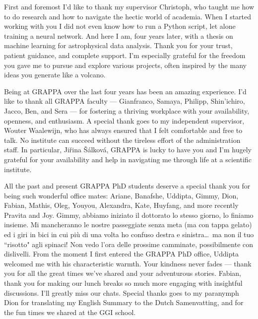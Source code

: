 
First and foremost I’d like to thank my supervisor Christoph, who taught me how to do research and how to navigate the hectic world of academia. When I started working with you I did not even know how to run a Python script, let alone training a neural network. And here I am, four years later, with a thesis on machine learning for astrophysical data analysis. Thank you for your trust, patient guidance, and complete support. I’m especially grateful for the freedom you gave me to pursue and explore various projects, often inspired by the many ideas you generate like a volcano.

Being at GRAPPA over the last four years has been an amazing experience. I'd like to thank all GRAPPA faculty --- Gianfranco, Samaya, Philipp, Shin'ichiro, Jacco, Ben, and Sera --- for fostering a thriving workplace with your availability, openness, and enthusiasm. A special thank goes to my independent supervisor, Wouter Waalewijn, who has always ensured that I felt comfortable and free to talk. No institute can succeed without the tireless effort of the administration staff. In particular, Ji\v{r}ina \v{S}\'{a}lkov\'{a}, GRAPPA is lucky to have you and I’m hugely grateful for your availability and help in navigating me through life at a scientific institute.

All the past and present GRAPPA PhD students deserve a special thank you for being such wonderful office mates: Ariane, Banafshe, Uddipta, Gimmy, Dion, Fabian, Mathis, Oleg, Youyou, Alexandra, Kate, Huyfang, and more recently Pravita and Joy. 
Gimmy, abbiamo iniziato il dottorato lo stesso giorno, lo finiamo insieme. Mi mancheranno le nostre passeggiate senza meta (ma con tappa gelato) ed i giri in bici in cui più di una volta ho confuso destra e sinistra\dots\ ma non il tuo ``risotto" agli spinaci! Non vedo l'ora delle prossime camminate, possibilmente con dislivelli.
From the moment I first entered the GRAPPA PhD office, Uddipta welcomed me with his characteristic warmth. Your kindness never fades — thank you for all the great times we've shared and your adventurous stories.
Fabian, thank you for making our lunch breaks so much more engaging with insightful discussions. I'll greatly miss our chats.
Special thanks goes to my paranymph Dion for translating my English Summary to the Dutch Samenvatting, and for the fun times we shared at the GGI school. 

